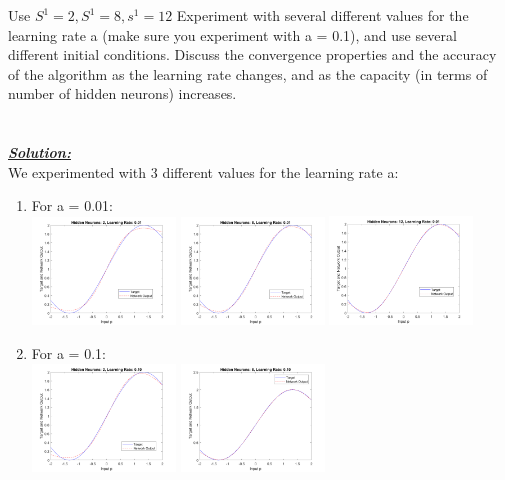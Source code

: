 \documentclass{article}
\begin{document}
\noindent Use $S^1=2, S^1=8, s^1=12$  Experiment with several different values for the learning
rate a (make sure you experiment with a = 0.1), and use several different initial conditions.
Discuss the convergence properties and the accuracy of the algorithm as the learning rate
changes, and as the capacity (in terms of number of hidden neurons) increases. \\ \\ \\

\noindent \underline{\textbf{\textit{Solution:}}} \\ 

\noindent We experimented with 3 different values for the learning rate a:
\begin{enumerate}
  \item For a = 0.01: \\
  \includegraphics[width=0.3\textwidth]{Problem4_2_0.01.png}
  \includegraphics[width=0.3\textwidth]{Problem4_8_0.01.png}
  \includegraphics[width=0.3\textwidth]{Problem4_12_0.01.png}
  \item For a = 0.1: \\
  \includegraphics[width=0.3\textwidth]{Problem4_2_0.1.png}
  \includegraphics[width=0.3\textwidth]{Problem4_8_0.1.png}

\end{enumerate}
\end{document}
